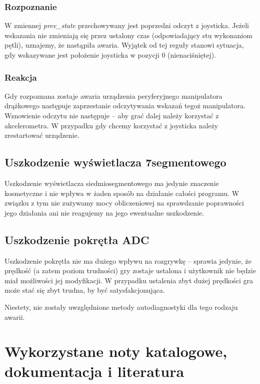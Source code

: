 \documentclass[a4paper,12pt,twoside]{article}
\theoremstyle{plain}
\theoremstyle{definition}
\theoremstyle{remark}
\begin{document}
	\subsubsection{Rozpoznanie}
	W zmiennej \textit{prev\_state} przechowywany jest poprzedni odczyt z joysticka. 
	Jeżeli wskazania nie zmieniają się przez ustalony czas (odpowiadający stu wykonaniom pętli), uznajemy, że nastąpiła awaria. Wyjątek od tej reguły stanowi sytuacja, gdy wskazywane jest położenie joysticka w pozycji $0$ (nienaciśniętej). 
	\subsubsection{Reakcja}
	Gdy rozpoznana zostaje awaria urządzenia peryferyjnego manipulatora drążkowego następuje zaprzestanie odczytywania wskazań tegoż manipulatora. Wznowienie odczytu nie następuje -- aby grać dalej należy korzystać z akcelerometra. W przypadku gdy chcemy korzystać z joysticka należy zrestartować urządzenie.
	
	\subsection{Uszkodzenie wyświetlacza 7segmentowego}
	Uszkodzenie wyświetlacza siedmiosegmentowego ma jedynie znaczenie kosmetyczne i nie wpływa w żaden sposób na działanie całości programu. W związku z tym nie zużywamy mocy obliczeniowej na sprawdzanie poprawności jego działania ani nie reagujemy na jego ewentualne uszkodzenie.
	
	\subsection{Uszkodzenie pokrętła ADC}
	Uszkodzenie pokrętła nie ma dużego wpływu na rozgrywkę -- sprawia jedynie, że prędkość (a zatem poziom trudności) gry zostaje ustalona i użytkownik nie będzie miał możliwości jej modyfikacji. W przypadku ustalenia zbyt dużej prędkości gra może stać się zbyt trudna, by być satysfakcjonująca.
	
	Niestety, nie zostały uwzględnione metody autodiagnostyki dla tego rodzaju awarii.
\section{Wykorzystane noty katalogowe, dokumentacja i literatura}
		
\end{document}
